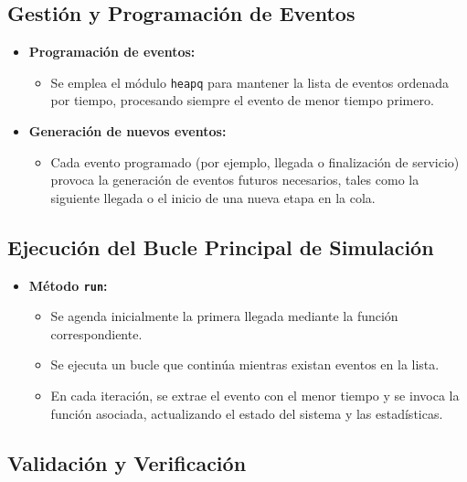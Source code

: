 \documentclass[a4paper,12pt]{article}
\begin{document}
\subsection{Gestión y Programación de Eventos}

\begin{itemize}[leftmargin=2cm]
    \item \textbf{Programación de eventos:}
    \begin{itemize}
        \item Se emplea el módulo \texttt{heapq} para mantener la lista de eventos ordenada por tiempo, procesando siempre el evento de menor tiempo primero.
    \end{itemize}
    \item \textbf{Generación de nuevos eventos:}
    \begin{itemize}
        \item Cada evento programado (por ejemplo, llegada o finalización de servicio) provoca la generación de eventos futuros necesarios, tales como la siguiente llegada o el inicio de una nueva etapa en la cola.
    \end{itemize}
\end{itemize}

\subsection{Ejecución del Bucle Principal de Simulación}

\begin{itemize}[leftmargin=2cm]
    \item \textbf{Método \texttt{run}:}
    \begin{itemize}
        \item Se agenda inicialmente la primera llegada mediante la función correspondiente.
        \item Se ejecuta un bucle que continúa mientras existan eventos en la lista.
        \item En cada iteración, se extrae el evento con el menor tiempo y se invoca la función asociada, actualizando el estado del sistema y las estadísticas.
    \end{itemize}
\end{itemize}

\subsection{Validación y Verificación}
\end{document}
